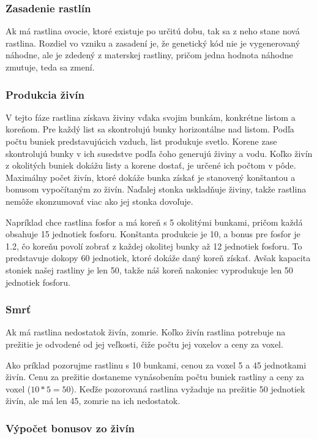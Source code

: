 \documentclass[12pt]{article}
\begin{document}
\subsubsection{Zasadenie rastlín}

Ak má rastlina ovocie, ktoré existuje po určitú dobu, tak sa z neho stane nová
rastlina. Rozdiel vo vzniku a zasadení je, že genetický kód nie je
vygenerovaný náhodne, ale je zdedený z materskej rastliny,
pričom jedna hodnota náhodne zmutuje, teda sa zmení.

\subsubsection{Produkcia živín}

V tejto fáze rastlina získava živiny vďaka svojim bunkám, konkrétne listom
a koreňom. Pre každý list sa skontrolujú bunky horizontálne nad listom.
Podľa počtu buniek predstavujúcich vzduch, list produkuje svetlo.
Korene zase skontrolujú bunky v ich susedstve podľa čoho generujú živiny a vodu.
Koľko živín z okolitých buniek dokážu listy a korene dostať,
je určené ich počtom v pôde. Maximálny počet živín, ktoré dokáže bunka získať je stanovený
konštantou a bonusom vypočítaným zo živín. Naďalej stonka uskladňuje živiny, takže
rastlina nemôže skonzumovať viac ako jej stonka dovoľuje.

Napríklad chce rastlina fosfor a má koreň s 5 okolitými bunkami,
pričom každá obsahuje 15 jednotiek fosforu. Konštanta produkcie je 10,
a bonus pre fosfor je 1.2, čo koreňu povolí zobrať z každej okolitej bunky až 12
jednotiek fosforu. To predstavuje dokopy 60 jednotiek, ktoré dokáže daný koreň získať.
Avšak kapacita stoniek našej rastliny je len 50, takže náš koreň nakoniec
vyprodukuje len 50 jednotiek fosforu.

\subsubsection{Smrť}

Ak má rastlina nedostatok živín, zomrie. Koľko živín rastlina
potrebuje na prežitie je odvodené od jej veľkosti, čiže počtu jej voxelov
a ceny za voxel.

Ako príklad pozorujme rastlinu s 10 bunkami, cenou za voxel 5 a 45 jednotkami živín.
Cenu za prežitie dostaneme vynásobením počtu buniek rastliny a ceny za voxel
($10 * 5 = 50$). Keďže pozorovaná rastlina vyžaduje na prežitie 50 jednotiek živín, ale má
len 45, zomrie na ich nedostatok.

\subsubsection{Výpočet bonusov zo živín}
\end{document}
